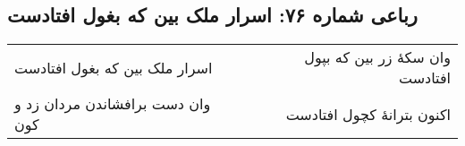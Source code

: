 \begin{center}
\section*{رباعی شماره ۷۶: اسرار ملک بین که بغول افتادست}
\label{sec:sh076}
\begin{longtable}{l p{0.5cm} r}
اسرار ملک بین که بغول افتادست
&&
وان سکهٔ زر بین که بپول افتادست
\\
وان دست برافشاندن مردان زد و کون
&&
اکنون بترانهٔ کچول افتادست
\\
\end{longtable}
\end{center}
